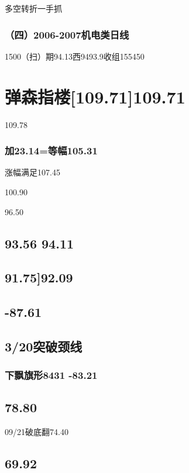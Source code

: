 \documentclass{article}
\begin{document}
多空转折一手抓

\subsubsection{（四）2006-2007机电类日线}

1500（扫）期94.13西9493.9收组155450

\section{弹森指楼[109.71]109.71}

109.78

\subsubsection{加23.14=等幅105.31}

涨幅满足107.45

100.90

96.50

\subsection{93.56 94.11}

\subsection{91.75]92.09}

\subsection{-87.61}

\subsection{3/20突破颈线}

\subsubsection{下飘旗形8431 -83.21}

\subsection{78.80}

09/21破底翻74.40

\subsection{69.92}
\end{document}
